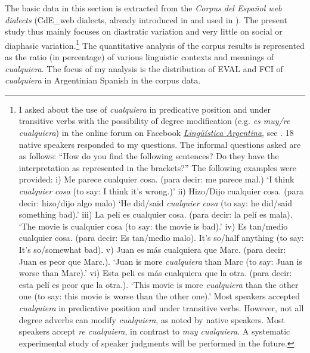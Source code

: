 {The basic data in this section is extracted from the \textit{Corpus del Español web dialects} (CdE\_web dialects, already introduced in  and used in ). The present study thus mainly focuses on diastratic variation and very little on social or diaphasic variation.}\footnote{{I asked about the use of} {\textit{cualquiera}} {in predicative position and under transitive verbs with the possibility of degree modification (e.g.} {\textit{es muy/re cualquiera}}{) in the online forum on Facebook} \href{https://www.facebook.com/groups/686284488187168/permalink/992126550936292/}{{{\textit{Lingüística Argentina}}}}, see . {18 native speakers responded to my questions. The informal questions asked are as follows: “How do you find the following sentences? Do they have the interpretation as represented in the brackets?” The following examples were provided:
  i) Me parece cualquier cosa. (para decir: me parece mal.) ‘I think \textit{cualquier cosa} (to say: I think it's wrong.)’
  ii) Hizo/Dijo cualquier cosa. (para decir: hizo/dijo algo malo) ‘He did/said \textit{cualquier cosa} (to say: he did/said something bad).’
  iii) La peli es cualquier cosa. (para decir: la pelí es mala). ‘The movie is cualquier cosa (to say: the movie is bad).’
  iv) Es tan/medio cualquier cosa. (para decir: Es tan/medio malo). It's so/half anything (to say: It's so/somewhat bad).
  v) Juan es más cualquiera que Marc. (para decir: Juan es peor que Marc.). ‘Juan is more \textit{cualquiera} than Marc (to say: Juan is worse than Marc).’
  vi) Esta peli es más cualquiera que la otra. (para decir: esta pelí es peor que la otra.). ‘This movie is more \textit{cualquiera} than the other one (to say: this movie is worse than the other one).’ Most speakers accepted} {\textit{cualquiera}} {in predicative position and under transitive verbs. However, not all degree adverbs can modify} {\textit{cualquiera}}{, as noted by native speakers. Most speakers accept} {\textit{re cualquiera}}{, in contrast to} {\textit{muy cualquiera}}. A systematic experimental study of speaker judgments will be performed in the future.} The quantitative analysis of the corpus results is represented as the ratio (in percentage) of various linguistic contexts and meanings of \textit{cualquiera}. The focus of my analysis is the distribution of EVAL and FCI of \textit{cualquiera} in Argentinian Spanish in the corpus data.

